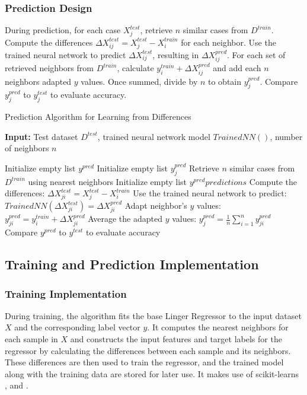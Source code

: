 \documentclass[a4paper, 12pt]{report}
\begin{document}
\subsubsection{Prediction Design}
During prediction, for each case $X^{test}_j$, retrieve $n$ similar cases from $D^{train}$. Compute the differences $\Delta X^{test}_{ij} = X^{test}_j - X^{train}_i$ for each neighbor. 
Use the trained neural network to predict $\Delta X^{test}_{ij}$, resulting in $\Delta X^{pred}_{ij}$. 
For each set of retrieved neighbors from $D^{train}$, calculate $y^{train}_i + \Delta X^{pred}_{ij}$ and add each $n$ neighbors adapted $y$ values. 
Once summed, divide by $n$ to obtain $y^{pred}_j$. Compare $y^{pred}_j$ to $y^{test}_j$ to evaluate accuracy.

\begin{algorithm}
    \caption{Prediction Algorithm for Learning from Differences}
	\textbf{Input:} Test dataset $D^{test}$, trained neural network model $Trained NN()$, number of neighbors $n$
    \label{alg:learning_from_differences_predict}
    \begin{algorithmic}
        \State Initialize empty list $y^{pred}$
            \State Initialize empty list $y^{pred}_j$
            \State Retrieve $n$ similar cases from $D^{train}$ using nearest neighbors
			\State Initialize empty list $y^{pred}predictions$
                \State Compute the differences: $\Delta X^{test}_{ji} = X^{test}_j - X^{train}_i$
                \State Use the trained neural network to predict: $Trained NN(\Delta X^{test}_{ji}) = {\Delta X^{pred}_{ji}}$
                \State Adapt neighbor's $y$ values: $y^{pred}_{ji} = y^{train}_i + \Delta X^{pred}_{ji}$
            \EndFor
            \State Average the adapted $y$ values: $y^{pred}_j = \frac{1}{n} \sum_{i=1}^{n} y^{pred}_{ji}$
        \EndFor
		\State Compare $y^{pred}$ to $y^{test}$ to evaluate accuracy
    \end{algorithmic}
\end{algorithm}

\subsection{Training and Prediction Implementation}
\subsubsection{Training Implementation}
During training, the algorithm fits the base Linger Regressor to the input dataset $X$ and the corresponding label vector $y$. 
It computes the nearest neighbors for each sample in $X$ and constructs the input features and target 
labels for the regressor by calculating the differences between each sample and its neighbors. 
These differences are then used to train the regressor, and the trained model along with the 
training data are stored for later use. It makes use of scikit-learns \cite{scikit-learn} ,  and .
\end{document}

